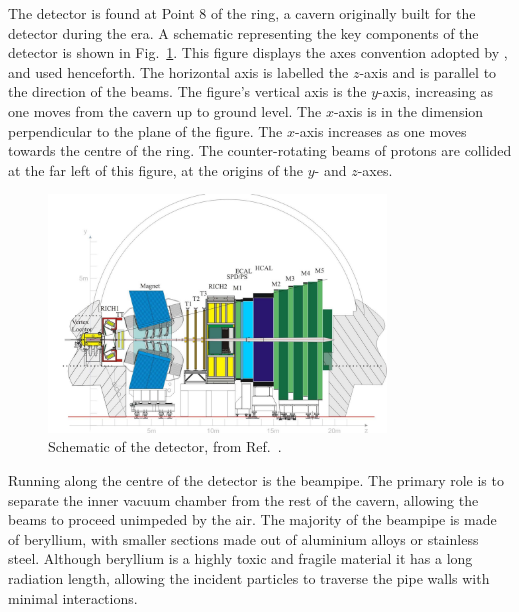 The \lhcb detector is found at Point 8 of the \lhc ring, a cavern originally built for the {\color{Red}\delphi} detector during the \lep era. A schematic representing the key components of the \lhcb detector is shown in Fig.~\ref{fig:Dec_lhcb_Schematic}. This figure displays the axes convention adopted by \lhcb, and used henceforth. The horizontal axis is labelled the $z$-axis and is parallel to the direction of the beams. The figure's vertical axis is the $y$-axis, increasing as one moves from the cavern up to ground level. The $x$-axis is in the dimension perpendicular to the plane of the figure. The $x$-axis increases as one moves towards the centre of the \lhc ring. The counter-rotating beams of protons are collided at the far left of this figure, at the origins of the $y$- and $z$-axes.   

\begin{figure}[!h]
    \centering
    \includegraphics[width=0.8\textwidth]{figs/Detector/LHCb_Detector_Schematic.pdf}
    \caption{Schematic of the \lhcb detector, from Ref.~\cite{Alves:2008zz}.}
    \label{fig:Dec_lhcb_Schematic}   
\end{figure}



Running along the centre of the detector is the \lhcb beampipe. The primary role is to separate the inner vacuum chamber from the rest of the cavern, allowing the beams to proceed unimpeded by the air. The majority of the beampipe is made of beryllium, with smaller sections made out of aluminium alloys or stainless steel. Although beryllium is a highly toxic and fragile material it has a long radiation length, allowing the incident particles to traverse the pipe walls with minimal interactions.  


